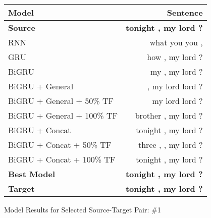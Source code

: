 \documentclass[twoside,twocolumn]{article}
\begin{document}
\begin{figure*}
    \centering
    \begin{tabular}{ |l|r| }
        \hline
        \textbf{Model}
          & \textbf{Sentence} \\
        \hline
        \textbf{Source} & \textbf{tonight , my lord ?} \\ \hline
        RNN & what you you , \\ \hline
        GRU & how , my lord ? \\ \hline
        BiGRU & my , my lord ? \\ \hline
        BiGRU + General & , my lord lord ? \\ \hline
        BiGRU + General + 50\% TF & my lord lord ? \\ \hline
        BiGRU + General + 100\% TF & brother , my lord ? \\ \hline
        BiGRU + Concat & tonight , my lord ? \\ \hline
        BiGRU + Concat + 50\% TF & three , , my lord ? \\ \hline
        BiGRU + Concat + 100\% TF & tonight , my lord ? \\ \hline
        \textbf{Best Model} & \textbf{tonight , my lord ?} \\ \hline
        \textbf{Target} & \textbf{tonight , my lord ?} \\ \hline
    \end{tabular}

    \caption{Model Results for Selected Source-Target Pair: \#1}
    \label{fig:model-results}
\end{figure*}
\end{document}

